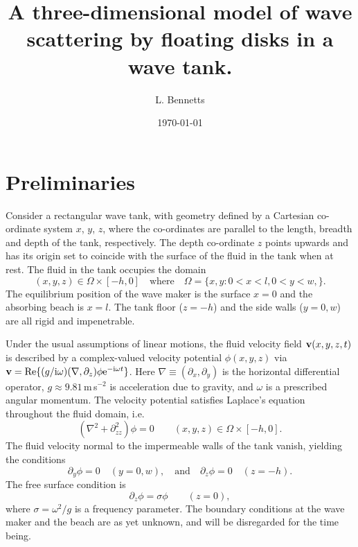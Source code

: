 \documentclass[12pt,a4paper]{article}
\newcommand{\real}{\textrm{Re}}
\def\ci{{\mathrm i}}
\renewcommand{\exp}{{\rm e}}
\newcommand{\lap}{\nabla^{2}}
\newcommand{\ie}{i.e.\ }
\newcommand{\dom}{\Omega }
\newcommand{\bv}{{\bf v}}
\newcommand{\vp}{{\phi}}
\newcommand{\fp}{{\sigma}}
\begin{document}
\title{A three-dimensional model of wave scattering by floating disks in a wave tank.}
\author{L. Bennetts}
\date{\today}
\maketitle

\section{Preliminaries}

Consider a rectangular wave tank, with geometry defined by a Cartesian co-ordinate system $x$, $y$, $z$, where the co-ordinates are parallel to the length, breadth and depth of the tank, respectively.
The depth co-ordinate $z$ points upwards and has its origin set to coincide with the surface of the fluid in the tank when at rest. 
The fluid in the tank occupies the domain
\begin{equation}
(x,y,z)\in 
\dom\times[-h,0]
\quad
\text{where}
\quad
\Omega
=
\{
x,y:
0<x<l,
0<y<w,
\}.
\end{equation}
The equilibrium position of the wave maker is the surface $x=0$ and the absorbing beach is $x=l$.
The tank floor ($z=-h$) and the side walls ($y=0,w$) are all rigid and impenetrable. 

Under the usual assumptions of linear motions, the fluid velocity field $\bv(x,y,z,t)$ is described by a complex-valued velocity potential $\vp(x,y,z)$ via $\bv=\real\{(g/\ci\omega)(\nabla,\partial_{z})\vp\exp^{-\ci\omega t}\}$.
Here $\nabla\equiv(\partial_{x},\partial_{y})$ is the horizontal differential operator, $g\approx 9.81$\,m\,s$^{-2}$ is acceleration due to gravity, and $\omega$ is a prescribed angular momentum.
The velocity potential satisfies Laplace's equation throughout the  fluid domain, \ie
\begin{equation}
(\lap+\partial^2_{zz})
\vp
=
0
\qquad
(x,y,z)\in\dom\times[-h,0].
\end{equation}
The fluid velocity normal to the impermeable walls of the tank vanish, yielding the conditions
\begin{equation}
\partial_{y}\vp = 0
\quad
(y=0,w),
\quad
\text{and}
\quad
\partial_{z}\vp = 0
\quad
(z=-h).
\end{equation}
The free surface condition is
\begin{equation}
\partial_{z}\vp
=
\fp\vp
\qquad
(z=0),
\end{equation}
where $\fp=\omega^{2}/g$ is a frequency parameter.
The boundary conditions at the wave maker and the beach are as yet unknown, and will be disregarded for the time being. 
 
\end{document}
